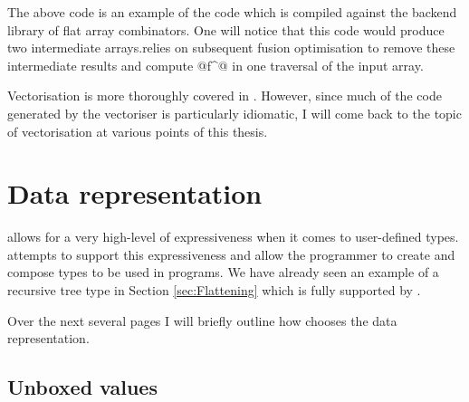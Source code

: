 \documentclass[preamble.tex]{subfiles}
\begin{document}
The above code is an example of the code which is compiled against the backend library of flat array combinators. One will notice that this code would produce two intermediate arrays.\iintermediate \DPH relies on subsequent fusion optimisation to remove these intermediate results and compute @f^@ in one traversal of the input array.




Vectorisation is more thoroughly covered in \cite{PLKC08}. However, since much of the code generated by the vectoriser is particularly idiomatic, I will come back to the topic of vectorisation at various points of this thesis.



\clearpage

\section{Data representation}
\label{sec:DPH-Data-Representation}

\Haskell allows for a very high-level of expressiveness when it comes to user-defined types. \DPH attempts to support this expressiveness and allow the programmer to create and compose types to be used in \DPH programs. We have already seen an example of a recursive tree type in Section \ref{sec:Flattening} which is fully supported by \DPH.

Over the next several pages I will briefly outline how \DPH chooses the data representation.


\subsection{Unboxed values}
\iboxing
\end{document}
